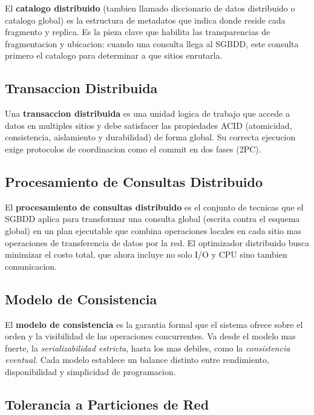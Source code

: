 \documentclass[11pt,a4paper]{article}
\begin{document}
El \textbf{catalogo distribuido} (tambien llamado diccionario de datos distribuido o catalogo global) es la estructura de metadatos que indica donde reside cada fragmento y replica. Es la pieza clave que habilita las transparencias de fragmentacion y ubicacion: cuando una consulta llega al SGBDD, este consulta primero el catalogo para determinar a que sitios enrutarla.

\subsection{Transaccion Distribuida}

Una \textbf{transaccion distribuida} es una unidad logica de trabajo que accede a datos en multiples sitios y debe satisfacer las propiedades ACID (atomicidad, consistencia, aislamiento y durabilidad) de forma global. Su correcta ejecucion exige protocolos de coordinacion como el commit en dos fases (2PC).

\subsection{Procesamiento de Consultas Distribuido}

El \textbf{procesamiento de consultas distribuido} es el conjunto de tecnicas que el SGBDD aplica para transformar una consulta global (escrita contra el esquema global) en un plan ejecutable que combina operaciones locales en cada sitio mas operaciones de transferencia de datos por la red. El optimizador distribuido busca minimizar el costo total, que ahora incluye no solo I/O y CPU sino tambien comunicacion.

\subsection{Modelo de Consistencia}

El \textbf{modelo de consistencia} es la garantia formal que el sistema ofrece sobre el orden y la visibilidad de las operaciones concurrentes. Va desde el modelo mas fuerte, la \textit{serializabilidad estricta}, hasta los mas debiles, como la \textit{consistencia eventual}. Cada modelo establece un balance distinto entre rendimiento, disponibilidad y simplicidad de programacion.

\subsection{Tolerancia a Particiones de Red}
\end{document}
